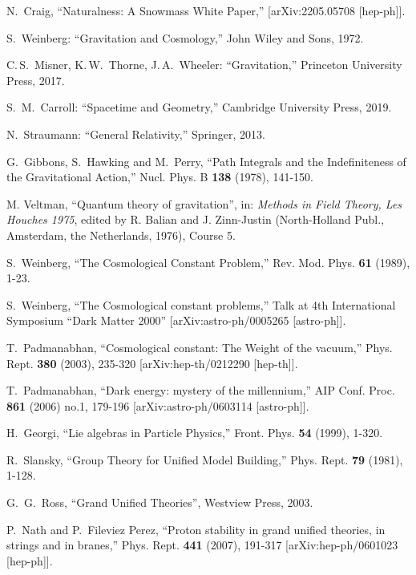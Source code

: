 \documentclass[12pt]{article}
\numberwithin{equation}{section}
\begin{document}
\begin{thebibliography}{999}
N.~Craig,
``Naturalness: A Snowmass White Paper,''
[arXiv:2205.05708 [hep-ph]].

 S.~Weinberg: ``Gravitation and Cosmology,''
John Wiley and Sons, 1972.

 C.$\,$S.~Misner, K.$\,$W.~Thorne, J.$\,$A.~Wheeler: ``Gravitation,'' Princeton University Press, 2017.

 S.~M.~Carroll: ``Spacetime and Geometry,'' Cambridge University Press, 2019.

 N.~Straumann: ``General Relativity,'' Springer, 2013.

G.~Gibbons, S.~Hawking and M.~Perry,
``Path Integrals and the Indefiniteness of the Gravitational Action,'' Nucl. Phys. B \textbf{138} (1978), 141-150.

 M. Veltman, ``Quantum theory of gravitation'', in: {\it Methods in Field Theory, Les Houches 1975}, edited by R. Balian and J. Zinn-Justin (North-Holland Publ., Amsterdam, the Netherlands, 1976), Course 5.

S.~Weinberg,
``The Cosmological Constant Problem,''
Rev. Mod. Phys. \textbf{61} (1989), 1-23.

S.~Weinberg,
``The Cosmological constant problems,''
Talk at 4th International Symposium ``Dark Matter 2000''
[arXiv:astro-ph/0005265 [astro-ph]].

T.~Padmanabhan,
``Cosmological constant: The Weight of the vacuum,''
Phys. Rept. \textbf{380} (2003), 235-320
[arXiv:hep-th/0212290 [hep-th]].

T.~Padmanabhan,
``Dark energy: mystery of the millennium,''
AIP Conf. Proc. \textbf{861} (2006) no.1, 179-196
[arXiv:astro-ph/0603114 [astro-ph]].

H.~Georgi, ``Lie algebras in Particle Physics,''
Front. Phys. \textbf{54} (1999), 1-320.

R.~Slansky, ``Group Theory for Unified Model Building,''
Phys. Rept. \textbf{79} (1981), 1-128.

G.~G.~Ross, ``Grand Unified Theories'', Westview Press, 2003.

P.~Nath and P.~Fileviez Perez,
``Proton stability in grand unified theories, in strings and in branes,'' Phys. Rept. \textbf{441} (2007), 191-317
[arXiv:hep-ph/0601023 [hep-ph]].


\end{thebibliography}
\end{document}
